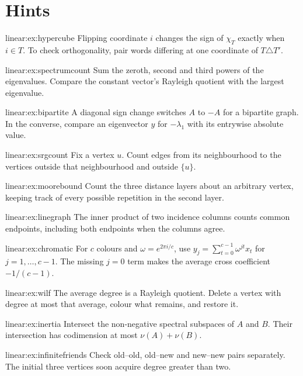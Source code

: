 \section{Hints}

\begin{hint}{linear:ex:hypercube}
Flipping coordinate $i$ changes the sign of $\chi_T$ exactly when $i\in T$. To check orthogonality, pair words differing at one coordinate of $T\triangle T'$.
\end{hint}
\begin{hint}{linear:ex:spectrumcount}
Sum the zeroth, second and third powers of the eigenvalues. Compare the constant vector's Rayleigh quotient with the largest eigenvalue.
\end{hint}
\begin{hint}{linear:ex:bipartite}
A diagonal sign change switches $A$ to $-A$ for a bipartite graph. In the converse, compare an eigenvector $y$ for $-\lambda_1$ with its entrywise absolute value.
\end{hint}
\begin{hint}{linear:ex:srgcount}
Fix a vertex $u$. Count edges from its neighbourhood to the vertices outside that neighbourhood and outside $\{u\}$.
\end{hint}
\begin{hint}{linear:ex:moorebound}
Count the three distance layers about an arbitrary vertex, keeping track of every possible repetition in the second layer.
\end{hint}
\begin{hint}{linear:ex:linegraph}
The inner product of two incidence columns counts common endpoints, including both endpoints when the columns agree.
\end{hint}
\begin{hint}{linear:ex:chromatic}
For $c$ colours and $\omega=e^{2\pi i/c}$, use $y_j=\sum_{t=0}^{c-1}\omega^{jt}x_t$ for $j=1,\ldots,c-1$. The missing $j=0$ term makes the average cross coefficient $-1/(c-1)$.
\end{hint}
\begin{hint}{linear:ex:wilf}
The average degree is a Rayleigh quotient. Delete a vertex with degree at most that average, colour what remains, and restore it.
\end{hint}
\begin{hint}{linear:ex:inertia}
Intersect the non-negative spectral subspaces of $A$ and $B$. Their intersection has codimension at most $\nu(A)+\nu(B)$.
\end{hint}
\begin{hint}{linear:ex:infinitefriends}
Check old--old, old--new and new--new pairs separately. The initial three vertices soon acquire degree greater than two.
\end{hint}
